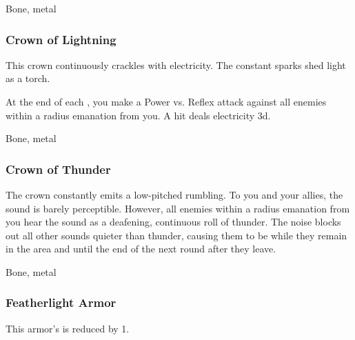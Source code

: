  


 Bone, metal


\lowercase{\hypertarget{item:Crown of Lightning}{}}\label{item:Crown of Lightning}
\hypertarget{item:Crown of Lightning}{\subsubsection{Crown of Lightning\hfill{}}}

This crown continuously crackles with electricity.
The constant sparks shed light as a torch.

At the end of each , you make a Power vs. Reflex attack against all enemies within a \areamed radius emanation from you.
A hit deals electricity  \minus3d.



 


 Bone, metal


\lowercase{\hypertarget{item:Crown of Thunder}{}}\label{item:Crown of Thunder}
\hypertarget{item:Crown of Thunder}{\subsubsection{Crown of Thunder\hfill{}}}

The crown constantly emits a low-pitched rumbling.
To you and your allies, the sound is barely perceptible.
However, all enemies within a \arealarge radius emanation from you hear the sound as a deafening, continuous roll of thunder.
The noise blocks out all other sounds quieter than thunder, causing them to be \deafened while they remain in the area and until the end of the next round after they leave.



 


 Bone, metal


\lowercase{\hypertarget{item:Featherlight Armor}{}}\label{item:Featherlight Armor}
\hypertarget{item:Featherlight Armor}{\subsubsection{Featherlight Armor\hfill{}}}

This armor's  is reduced by 1.



